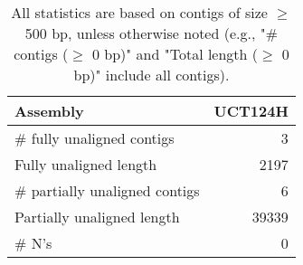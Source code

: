 \documentclass[12pt,a4paper]{article}
\begin{document}
\begin{table}[ht]
\begin{center}
\caption{All statistics are based on contigs of size $\geq$ 500 bp, unless otherwise noted (e.g., "\# contigs ($\geq$ 0 bp)" and "Total length ($\geq$ 0 bp)" include all contigs).}
\begin{tabular}{|l*{1}{|r}|}
\hline
Assembly & UCT124H \\ \hline
\# fully unaligned contigs & 3 \\ \hline
Fully unaligned length & 2197 \\ \hline
\# partially unaligned contigs & 6 \\ \hline
Partially unaligned length & 39339 \\ \hline
\# N's & 0 \\ \hline
\end{tabular}
\end{center}
\end{table}
\end{document}
